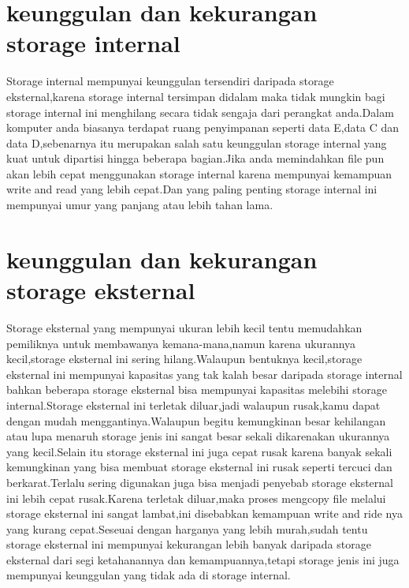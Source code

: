 \section{keunggulan dan kekurangan storage internal}

Storage internal mempunyai keunggulan tersendiri daripada storage eksternal,karena storage internal tersimpan didalam maka tidak mungkin bagi storage internal ini menghilang secara tidak sengaja dari perangkat anda.Dalam komputer anda biasanya terdapat ruang penyimpanan seperti data E,data C dan data D,sebenarnya itu merupakan salah satu keunggulan storage internal yang kuat untuk dipartisi hingga beberapa bagian.Jika anda memindahkan file pun akan lebih cepat menggunakan storage internal karena mempunyai kemampuan write and read yang lebih cepat.Dan yang paling penting storage internal ini mempunyai umur yang panjang atau lebih tahan lama.

\section{keunggulan dan kekurangan storage eksternal}

Storage eksternal yang mempunyai ukuran lebih kecil tentu memudahkan pemiliknya untuk membawanya kemana-mana,namun karena ukurannya kecil,storage eksternal ini sering hilang.Walaupun bentuknya kecil,storage eksternal ini mempunyai kapasitas yang tak kalah besar daripada storage internal bahkan beberapa storage eksternal bisa mempunyai kapasitas melebihi storage internal.Storage eksternal ini terletak diluar,jadi walaupun rusak,kamu dapat dengan mudah menggantinya.Walaupun begitu kemungkinan besar kehilangan atau lupa menaruh storage jenis ini sangat besar sekali dikarenakan ukurannya yang kecil.Selain itu storage eksternal ini juga cepat rusak karena banyak sekali kemungkinan yang bisa membuat storage eksternal ini rusak seperti tercuci dan berkarat.Terlalu sering digunakan juga bisa menjadi penyebab storage eksternal ini lebih cepat rusak.Karena terletak diluar,maka proses mengcopy file melalui storage eksternal ini sangat lambat,ini disebabkan kemampuan write and ride nya yang kurang cepat.Seseuai dengan harganya yang lebih murah,sudah tentu storage eksternal ini mempunyai kekurangan lebih banyak daripada storage eksternal dari segi ketahanannya dan kemampuannya,tetapi storage jenis ini juga mempunyai keunggulan yang tidak ada di storage internal.

